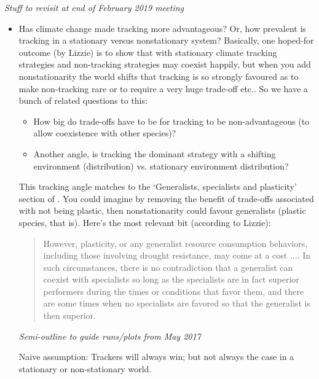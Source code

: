 \documentclass[11pt,letterpaper]{article}
\renewcommand{\subsection}[1]{%
\bigskip
\begin{center}
\begin{large}
\normalfont\itshape #1
\end{large}
\end{center}}
\begin{document}
\subsection{Stuff to revisit at end of February 2019 meeting}
\begin{itemize}
\item Has climate change made tracking more advantageous? Or, how prevalent is tracking in a stationary versus nonstationary system? Basically, one hoped-for outcome (by Lizzie) is to show that with stationary climate tracking strategies and non-tracking strategies may coexist happily, but when you add nonstationarity the world shifts that tracking is so strongly favoured as to make non-tracking rare or to require a very huge trade-off etc.. So we have a bunch of related questions to this:
\begin{itemize}
\item How big do trade-offs have to be for tracking to be non-advantageous (to allow coexistence with other species)?
\item Another angle, is tracking the dominant strategy with a shifting environment (distribution) vs. stationary environment distribution?
\end{itemize}

\noindent This tracking angle matches to the `Generalists, specialists and plasticity' section of \citet{Chesson:2004eo}. You could imagine by removing the benefit of trade-offs associated with not being plastic, then nonstationarity could favour generalists (plastic species, that is). Here's the most relevant bit (according to Lizzie):
\begin{quote}
However, plasticity, or any generalist resource consumption
behaviors, including those involving drought resistance,
may come at a cost .... In such circumstances, there is no
contradiction that a generalist can coexist with specialists
so long as the specialists are in fact superior performers
during the times or conditions that favor them, and there 
are some times when no specialists are favored so that the
generalist is then superior.
\end{quote}





\subsection{Semi-outline to guide runs/plots from May 2017} Naive assumption: Trackers will always win; but not always the case in a stationary or non-stationary world. 


\end{itemize}
\end{document}

